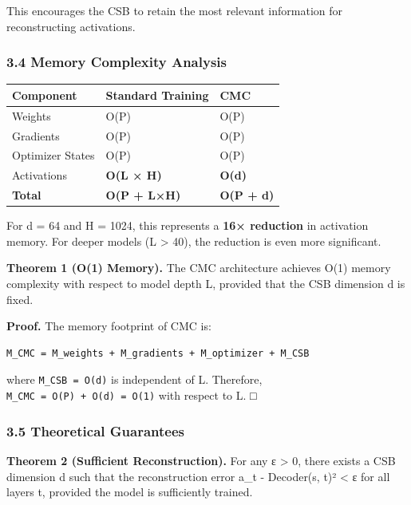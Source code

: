 \documentclass[
  11pt,
  a4paper,
]{article}
\begin{document}
This encourages the CSB to retain the most relevant information for
reconstructing activations.

\subsubsection{3.4 Memory Complexity
Analysis}\label{memory-complexity-analysis}

\begin{longtable}[]{@{}lll@{}}
\toprule\noalign{}
Component & Standard Training & CMC \\
\midrule\noalign{}
\endhead
\bottomrule\noalign{}
\endlastfoot
Weights & O(P) & O(P) \\
Gradients & O(P) & O(P) \\
Optimizer States & O(P) & O(P) \\
Activations & \textbf{O(L × H)} & \textbf{O(d)} \\
\textbf{Total} & \textbf{O(P + L×H)} & \textbf{O(P + d)} \\
\end{longtable}

For d = 64 and H = 1024, this represents a \textbf{16× reduction} in
activation memory. For deeper models (L \textgreater{} 40), the
reduction is even more significant.

\textbf{Theorem 1 (O(1) Memory).} The CMC architecture achieves O(1)
memory complexity with respect to model depth L, provided that the CSB
dimension d is fixed.

\textbf{Proof.} The memory footprint of CMC is:

\begin{verbatim}
M_CMC = M_weights + M_gradients + M_optimizer + M_CSB
\end{verbatim}

where \texttt{M\_CSB\ =\ O(d)} is independent of L. Therefore,
\texttt{M\_CMC\ =\ O(P)\ +\ O(d)\ =\ O(1)} with respect to L. □

\subsubsection{3.5 Theoretical Guarantees}\label{theoretical-guarantees}

\textbf{Theorem 2 (Sufficient Reconstruction).} For any ε \textgreater{}
0, there exists a CSB dimension d such that the reconstruction error
\textbar\textbar a\_t - Decoder(s, t)\textbar\textbar² \textless{} ε for
all layers t, provided the model is sufficiently trained.
\end{document}
